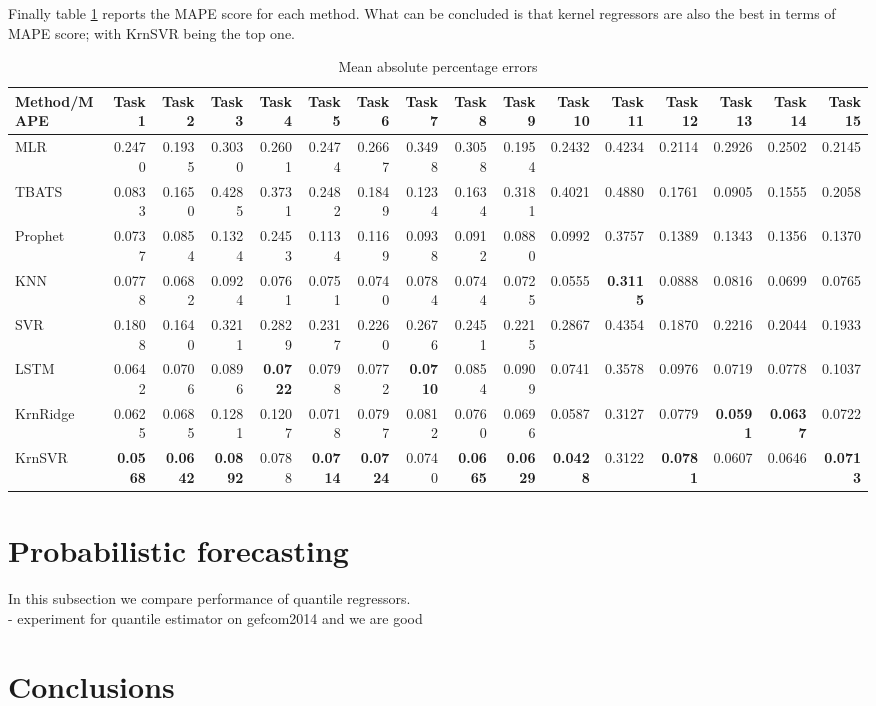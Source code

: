 Finally table \ref{tab:point_MAPE} reports the MAPE score for each method. What can be concluded is that kernel regressors are also the best in terms of MAPE score; with KrnSVR being the top one.
\begin{table}[!ht]
    \caption{Mean absolute percentage errors}
    \label{tab:point_MAPE}
    \begin{adjustbox}{width=\textwidth, height=3cm}
        \begin{tabular}{lrrrrrrrrrrrrrrr}
            \toprule
             Method/MAPE & Task 1 & Task 2 & Task 3 & Task 4 & Task 5 & Task 6 & Task 7 & Task 8 & Task 9 & Task 10 & Task 11 & Task 12 & Task 13 & Task 14 & Task 15 \\
            \midrule
            MLR & 0.2470 & 0.1935 & 0.3030 & 0.2601 & 0.2474 & 0.2667 & 0.3498 & 0.3058 & 0.1954 & 0.2432 & 0.4234 & 0.2114 & 0.2926 & 0.2502 & 0.2145 \\
            TBATS & 0.0833 & 0.1650 & 0.4285 & 0.3731 & 0.2482 & 0.1849 & 0.1234 & 0.1634 & 0.3181 & 0.4021 & 0.4880 & 0.1761 & 0.0905 & 0.1555 & 0.2058 \\
            Prophet & 0.0737 & 0.0854 & 0.1324 & 0.2453 & 0.1134 & 0.1169 & 0.0938 & 0.0912 & 0.0880 & 0.0992 & 0.3757 & 0.1389 & 0.1343 & 0.1356 & 0.1370 \\
            KNN & 0.0778 & 0.0682 & 0.0924 & 0.0761 & 0.0751 & 0.0740 & 0.0784 & 0.0744 & 0.0725 & 0.0555 & \textbf{0.3115} & 0.0888 & 0.0816 & 0.0699 & 0.0765 \\
            SVR & 0.1808 & 0.1640 & 0.3211 & 0.2829 & 0.2317 & 0.2260 & 0.2676 & 0.2451 & 0.2215 & 0.2867 & 0.4354 & 0.1870 & 0.2216 & 0.2044 & 0.1933 \\
            LSTM & 0.0642 & 0.0706 & 0.0896 & \textbf{0.0722} & 0.0798 & 0.0772 & \textbf{0.0710} & 0.0854 & 0.0909 & 0.0741 & 0.3578 & 0.0976 & 0.0719 & 0.0778 & 0.1037 \\
            KrnRidge & 0.0625 & 0.0685 & 0.1281 & 0.1207 & 0.0718 & 0.0797 & 0.0812 & 0.0760 & 0.0696 & 0.0587 & 0.3127 & 0.0779 & \textbf{0.0591} & \textbf{0.0637} & 0.0722 \\
            KrnSVR & \textbf{0.0568} & \textbf{0.0642} & \textbf{0.0892} & 0.0788 & \textbf{0.0714} & \textbf{0.0724} & 0.0740 & \textbf{0.0665} & \textbf{0.0629} & \textbf{0.0428} & 0.3122 & \textbf{0.0781} & 0.0607 & 0.0646 & \textbf{0.0713} \\
            \bottomrule
            \end{tabular}            
    \end{adjustbox}
\end{table}

\section{Probabilistic forecasting}
In this subsection we compare performance of quantile regressors.
\\
- experiment for quantile estimator on gefcom2014 and we are good


\section{Conclusions}